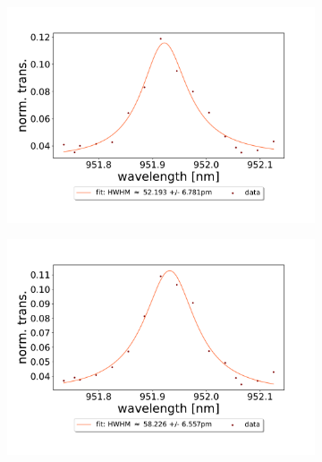 \begin{figure}[h!]
\begin{subfigure}[b]{0.49\textwidth}
        \includegraphics[width=\textwidth]{figures/results/double fano fits/20250326/33um_M3:M5_fit_3.pdf}
        \caption{}
        \label{fig:33um_M3:M5_fit_3}
    \end{subfigure}
    \begin{subfigure}[b]{0.49\textwidth}
        \includegraphics[width=\textwidth]{figures/results/double fano fits/20250326/33um_M3:M5_fit_4.pdf}
        \caption{}
        \label{fig:33um_M3:M5_fit_4}
    \end{subfigure}
    \begin{subfigure}[b]{0.49\textwidth}

\end{subfigure}
\end{figure}
